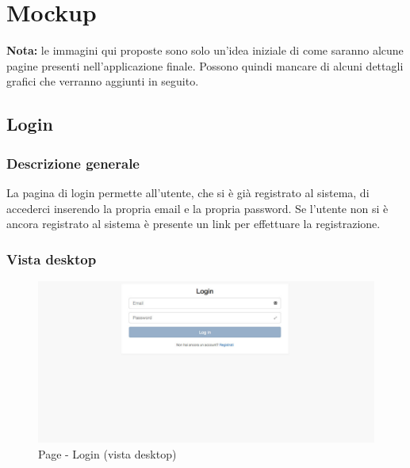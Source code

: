 %

\appendix


\section{Mockup} %
\label{sec:mockup}
\textbf{Nota:} le immagini qui proposte sono solo un'idea iniziale di come saranno alcune pagine presenti nell'applicazione finale. Possono quindi mancare di alcuni dettagli grafici che verranno aggiunti in seguito.

	\subsection{Login} %
	\label{sub:login}
		\subsubsection{Descrizione generale} %
		La pagina di login permette all'utente, che si è già registrato al sistema, di accederci inserendo la propria email e la propria password. Se l'utente non si è ancora registrato al sistema è presente un link per effettuare la registrazione.

		\subsubsection{Vista desktop} %
		\begin{figure}[htbp]
			\centering
			\centerline{\includegraphics[scale=0.4]{./images/mockup/login_vd.pdf}}
			\caption{Page - Login (vista desktop)}
		\end{figure}

